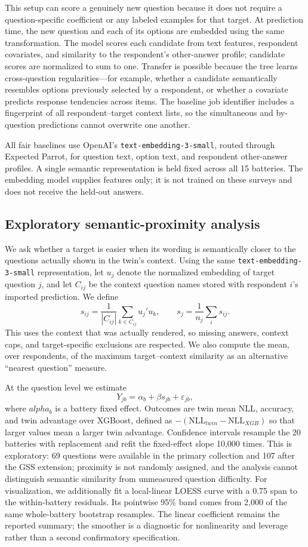 \documentclass[11pt]{article}
\begin{document}
This setup can score a genuinely new question because it does not require a
question-specific coefficient or any labeled examples for that target. At
prediction time, the new question and each of its options are embedded using
the same transformation. The model scores each candidate from text features,
respondent covariates, and similarity to the respondent's other-answer
profile; candidate scores are normalized to sum to one. Transfer is possible
because the tree learns cross-question regularities---for example, whether a
candidate semantically resembles options previously selected by a respondent,
or whether a covariate predicts response tendencies across items. The baseline
job identifier includes a fingerprint of all respondent--target context lists,
so the simultaneous and by-question predictions cannot overwrite one another.

All fair baselines use OpenAI's \texttt{text-embedding-3-small}, routed through
Expected Parrot, for question text, option text, and respondent other-answer
profiles. A single semantic representation is held fixed across all 15
batteries. The embedding model supplies features only;
it is not trained on these surveys and does not receive the held-out answers.

\subsection{Exploratory semantic-proximity analysis}
We ask whether a target is easier when its wording is semantically closer to
the questions actually shown in the twin's context. Using the same
\texttt{text-embedding-3-small} representation, let $u_j$ denote the normalized
embedding of target question $j$, and let $C_{ij}$ be the context question names
stored with respondent $i$'s imported prediction. We define
\[
 s_{ij}=\frac{1}{|C_{ij}|}\sum_{k\in C_{ij}}u_j'u_k,
 \qquad s_j=\frac{1}{n_j}\sum_i s_{ij}.
\]
This uses the context that was actually rendered, so missing answers, context
caps, and target-specific exclusions are respected. We also compute the mean,
over respondents, of the maximum target--context similarity as an alternative
``nearest question'' measure.

At the question level we estimate
\[
 Y_{jb}=\alpha_b+\beta s_{jb}+\varepsilon_{jb},
\]
where $alpha_b$ is a battery fixed effect. Outcomes are twin mean NLL,
accuracy, and twin advantage over XGBoost, defined as
$-(\mathrm{NLL}_{twin}-\mathrm{NLL}_{XGB})$ so that larger values mean a larger
twin advantage. Confidence intervals resample the 20 batteries with replacement
and refit the fixed-effect slope 10,000 times. This is exploratory: 69
questions were available in the primary collection and 107 after the GSS
extension; proximity is not randomly assigned, and the analysis
cannot distinguish semantic similarity from unmeasured question difficulty.
For visualization, we additionally fit a local-linear LOESS curve with a 0.75
span to the within-battery residuals. Its pointwise 95\% band comes from 2,000
of the same whole-battery bootstrap resamples. The linear coefficient remains
the reported summary; the smoother is a diagnostic for nonlinearity and
leverage rather than a second confirmatory specification.
\end{document}
